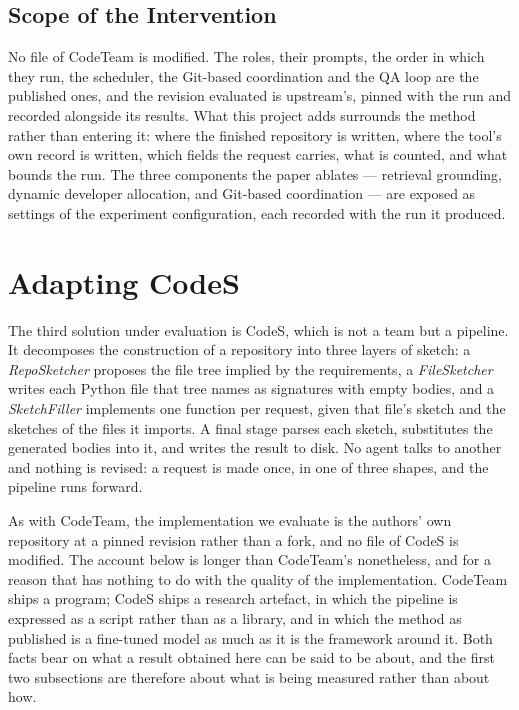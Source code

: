 \subsection{Scope of the Intervention}

No file of CodeTeam is modified. The roles, their prompts, the order in which
they run, the scheduler, the Git-based coordination and the QA loop are the
published ones, and the revision evaluated is upstream's, pinned with the run
and recorded alongside its results. What this project adds surrounds the method
rather than entering it: where the finished repository is written, where the
tool's own record is written, which fields the request carries, what is counted,
and what bounds the run. The three components the paper ablates --- retrieval
grounding, dynamic developer allocation, and Git-based coordination --- are
exposed as settings of the experiment configuration, each recorded with the run
it produced.

\section{Adapting CodeS}

The third solution under evaluation is CodeS, which is not a team but a
pipeline. It decomposes the construction of a repository into three layers of
sketch: a \emph{RepoSketcher} proposes the file tree implied by the
requirements, a \emph{FileSketcher} writes each Python file that tree names as
signatures with empty bodies, and a \emph{SketchFiller} implements one function
per request, given that file's sketch and the sketches of the files it imports.
A final stage parses each sketch, substitutes the generated bodies into it, and
writes the result to disk. No agent talks to another and nothing is revised: a
request is made once, in one of three shapes, and the pipeline runs forward.

As with CodeTeam, the implementation we evaluate is the authors' own repository
at a pinned revision rather than a fork, and no file of CodeS is modified. The
account below is longer than CodeTeam's nonetheless, and for a reason that has
nothing to do with the quality of the implementation. CodeTeam ships a program;
CodeS ships a research artefact, in which the pipeline is expressed as a script
rather than as a library, and in which the method as published is a fine-tuned
model as much as it is the framework around it. Both facts bear on what a
result obtained here can be said to be about, and the first two subsections are
therefore about what is being measured rather than about how.

